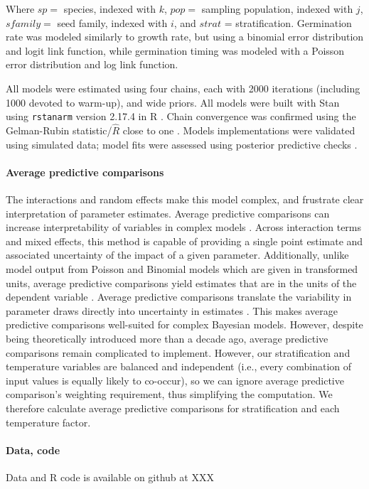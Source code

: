 \documentclass[12pt]{article}\usepackage[]{graphicx}\usepackage[]{color}
\begin{document}
	 Where $sp = $ species, indexed with $k$, $pop =$ sampling population, indexed with $j$, $sfamily =$ seed family, indexed with $i$, and $strat$ = stratification. Germination rate was modeled similarly to growth rate, but using a binomial error distribution and logit link function, while germination timing was modeled with a Poisson error distribution and log link function. 
	 	
	All models were estimated using four chains, each with 2000 iterations (including 1000 devoted to warm-up), and wide priors. All models were built with Stan \parencite{Carpenter2017} using \texttt{rstanarm} version 2.17.4 \parencite{Goodrich2018} in R \parencite{Team2015}. Chain convergence was confirmed using the Gelman-Rubin statistic/$\hat{R}$ close to one \parencite{Gelman1992}. Models implementations were validated using simulated data; model fits were assessed using posterior predictive checks \parencite{Gelman2004}.  
	
	
	\paragraph{Average predictive comparisons} The interactions and random effects make this model complex, and frustrate clear interpretation of parameter estimates. Average predictive comparisons can increase interpretability of variables in complex models \parencite{Gelman2007}. Across interaction terms and mixed effects, this method is capable of providing a single point estimate and associated uncertainty of the impact of a given parameter. Additionally, unlike model output from Poisson and Binomial models which are given in transformed units, average predictive comparisons yield estimates that are in the units of the dependent variable \parencite{Gelman2007}. Average predictive comparisons translate the variability in parameter draws directly into uncertainty in estimates \parencite{Gelman2007}. This makes average predictive comparisons well-suited for complex Bayesian models. However, despite being theoretically introduced more than a decade ago, average predictive comparisons remain complicated to implement. However, our stratification and temperature variables are balanced and independent  (i.e., every combination of input values is equally likely to co-occur), so we can ignore average predictive comparison's weighting requirement, thus simplifying the computation. We therefore calculate average predictive comparisons for stratification and each temperature factor.
	
	\paragraph{Data, code} 
	Data and R code is available on github at XXX
\end{document}
